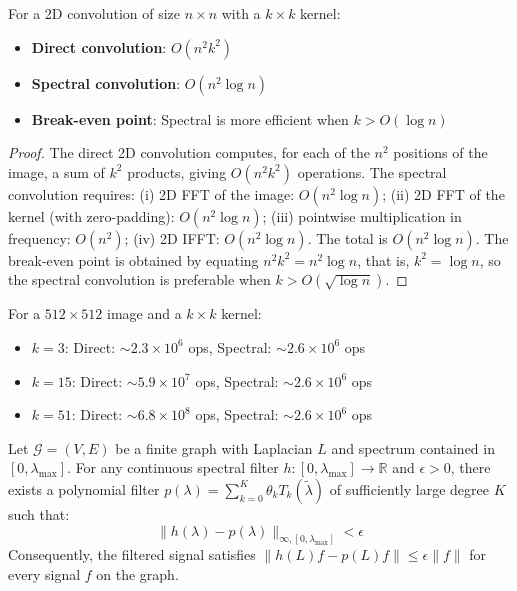 \begin{theorem}\label{thm:complejidad_convoluciones_espectrales}
For a 2D convolution of size $n \times n$ with a $k \times k$ kernel:
\begin{itemize}
    \item \textbf{Direct convolution}: $O(n^2 k^2)$
    \item \textbf{Spectral convolution}: $O(n^2 \log n)$
    \item \textbf{Break-even point}: Spectral is more efficient when $k > O(\log n)$
\end{itemize}
\end{theorem}

\begin{proof}
The direct 2D convolution computes, for each of the $n^2$ positions of the image, a sum of $k^2$ products, giving $O(n^2 k^2)$ operations. The spectral convolution requires: (i) 2D FFT of the image: $O(n^2 \log n)$; (ii) 2D FFT of the kernel (with zero-padding): $O(n^2 \log n)$; (iii) pointwise multiplication in frequency: $O(n^2)$; (iv) 2D IFFT: $O(n^2 \log n)$. The total is $O(n^2 \log n)$. The break-even point is obtained by equating $n^2 k^2 = n^2 \log n$, that is, $k^2 = \log n$, so the spectral convolution is preferable when $k > O(\sqrt{\log n})$.
\end{proof}

\begin{example}\label{ex:eficiencia_practica}
For a $512 \times 512$ image and a $k \times k$ kernel:
\begin{itemize}
    \item $k = 3$: Direct: $\sim 2.3 \times 10^6$ ops, Spectral: $\sim 2.6 \times 10^6$ ops
    \item $k = 15$: Direct: $\sim 5.9 \times 10^7$ ops, Spectral: $\sim 2.6 \times 10^6$ ops
    \item $k = 51$: Direct: $\sim 6.8 \times 10^8$ ops, Spectral: $\sim 2.6 \times 10^6$ ops
\end{itemize}
\end{example}

\begin{theorem}\label{thm:aproximacion_universal_espectral}
Let $\mathcal{G} = (V, E)$ be a finite graph with Laplacian $L$ and spectrum contained in $[0, \lambda_{\max}]$. For any continuous spectral filter $h: [0, \lambda_{\max}] \to \mathbb{R}$ and $\epsilon > 0$, there exists a polynomial filter $p(\lambda) = \sum_{k=0}^{K} \theta_k T_k(\tilde{\lambda})$ of sufficiently large degree $K$ such that:
\begin{equation}
\|h(\lambda) - p(\lambda)\|_{\infty, [0, \lambda_{\max}]} < \epsilon
\end{equation}
Consequently, the filtered signal satisfies $\|h(L)f - p(L)f\| \leq \epsilon \|f\|$ for every signal $f$ on the graph.
\end{theorem}

